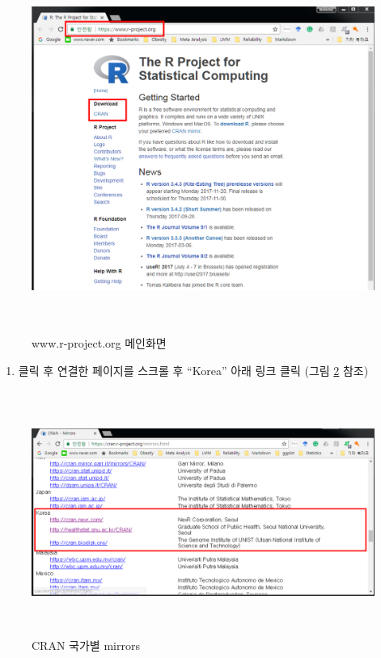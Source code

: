 \documentclass[11pt,a4paper]{book}
\providecommand{\tightlist}{%
  \setlength{\itemsep}{0pt}\setlength{\parskip}{0pt}}
\theoremstyle{definition}
\theoremstyle{definition}
\theoremstyle{definition}
\theoremstyle{remark}
\begin{document}
\begin{figure}[H]
{
  \centering
  \includegraphics[width = 12cm, height = 12cm]{Figures/Rorg-main-add.png}
  \caption[www.r-project.org 메인화면]{www.r-project.org 메인화면}\label{fig:R-install-01}
}
\end{figure}

\begin{enumerate}
\def\labelenumi{\arabic{enumi}.}
\setcounter{enumi}{2}
\tightlist
\item
  클릭 후 연결한 페이지를 스크롤 후 ``Korea'' 아래 링크 클릭 (그림
  \ref{fig:R-install-02} 참조)
\end{enumerate}

\begin{figure}[H]
{
  \centering
  \includegraphics[width = 12cm, height = 8cm]{Figures/CRAN-korea-01.PNG}
  \caption[CRAN 국가별 mirrors]{CRAN 국가별 mirrors}\label{fig:R-install-02}
}
\end{figure}
\end{document}
